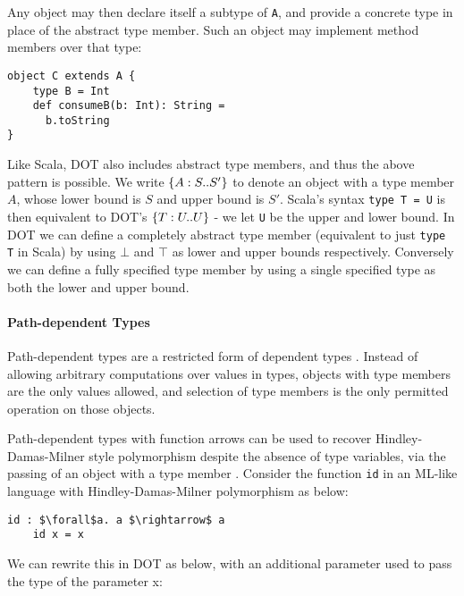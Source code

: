 \noindent Any object may then declare itself a subtype of \texttt{A}, and
provide a concrete type in place of the abstract type member. Such an object may
implement method members over that type:

\begin{minipage}{\linewidth}
\begin{lstlisting}[mathescape]
object C extends A {
    type B = Int
    def consumeB(b: Int): String =
      b.toString
}
\end{lstlisting}
\end{minipage}

\noindent Like Scala, DOT also includes abstract type members, and thus the
above pattern is possible. We write $\{A : S .. S'\}$ to denote an object with a
type member $A$, whose lower bound is $S$ and upper bound is $S'$. Scala's
syntax \texttt{type T = U} is then equivalent to DOT's $\{T : U .. U\}$ - we let
\texttt{U} be the upper and lower bound. In DOT we can define a completely
abstract type member (equivalent to just \texttt{type T} in Scala) by using
$\bot$ and $\top$ as lower and upper bounds respectively. Conversely we can
define a fully specified type member by using a single specified type as both
the lower and upper bound.

\paragraph{Path-dependent Types}
Path-dependent types are a restricted form of dependent types \cite{AGORS16}.
Instead of allowing arbitrary computations over values in types, objects with
type members are the only values allowed, and selection of type members is the
only permitted operation on those objects.

Path-dependent types with function arrows can be used to recover
Hindley-Damas-Milner style polymorphism despite the absence of type variables,
via the passing of an object with a type member \cite{AGORS16}. Consider the
function \texttt{id} in an ML-like language with Hindley-Damas-Milner
polymorphism as below:

\begin{minipage}{\linewidth}
\begin{lstlisting}[mathescape]
    id : $\forall$a. a $\rightarrow$ a
    id x = x
\end{lstlisting}
\end{minipage}

We can rewrite this in DOT as below, with an additional parameter used to pass the type of the parameter x:

